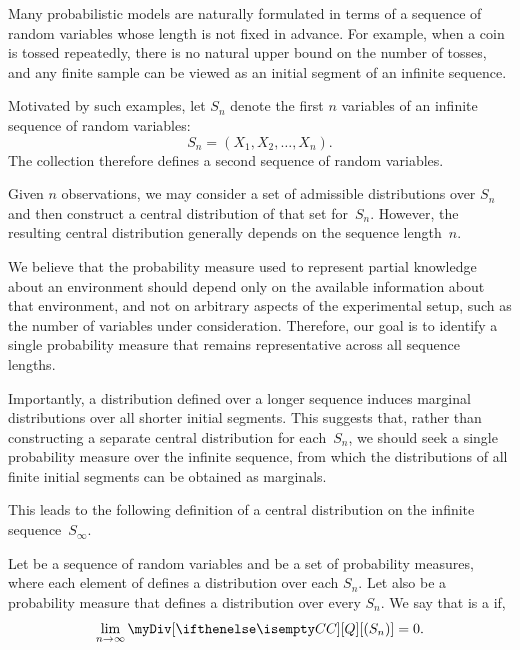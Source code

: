 \newcommand{\uniConverge}[2]{\toInf  \sup_{#1} \left| {#2} \right| = 0}
\newcommand{\estLike}{Q \left( \est_{n} \mid \paramVal \right) }
\newcommand{\TVdist}[3][(S_{n})]{\left\| #2#1 - #3#1 \right\|_{\mathrm{TV}}}

Many probabilistic models are naturally formulated in terms of a sequence of random variables whose length is not
fixed in advance.
For example, when a coin is tossed repeatedly, there is no natural upper bound on the number of tosses, and any
finite sample can be viewed as an initial segment of an infinite sequence.

Motivated by such examples, let $S_n$ denote the first $n$ variables of an
infinite sequence of random variables:
\[
    S_n = (X_1, X_2, \ldots, X_n).
\]
The collection  therefore defines a second sequence of random variables.

Given $n$ observations, we may consider a set of admissible distributions over $S_n$ and then construct a central
distribution of that set for~$S_n$.
However, the resulting central distribution generally depends on the sequence length~$n$.

We believe that the probability measure used to represent partial knowledge about an environment should depend
only on the available information about that environment, and not on arbitrary aspects of the experimental setup,
such as the number of variables under consideration.
Therefore, our goal is to identify a single probability measure that remains representative across all sequence
lengths.

Importantly, a distribution defined over a longer sequence induces marginal distributions over all shorter
initial segments.
This suggests that, rather than constructing a separate central distribution for each~$S_n$,
we should seek a single probability measure over the infinite sequence, from which the distributions of all
finite initial segments can be obtained as marginals.

This leads to the following definition of a central distribution on the infinite sequence~$S_{\infty}$.

\begin{definition} \label{def:asymptotic-central}
    Let  be a sequence of random variables and \setQ be a set of probability measures,
    where each element of \setQ defines a distribution over each $S_n$.
    Let \cDist also be a probability measure that defines a distribution over every $S_n$.
    We say that \cDist is a \emph{\cd[\infSeq{S}]} if,
    \begin{equation*}
        \toInf \myDiv[\cDist][Q][(S_n)] = 0.
    \end{equation*}
\end{definition}

